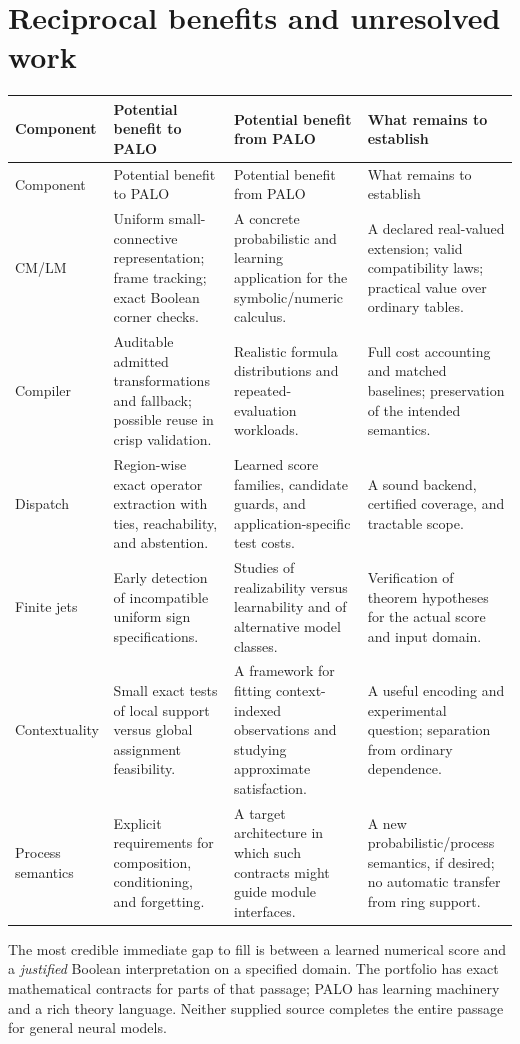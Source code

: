\documentclass[11pt,a4paper]{article}
\theoremstyle{remark}
\begin{document}
\section{Reciprocal benefits and unresolved work}
\small
\begin{longtable}{@{}P{23mm}P{41mm}P{41mm}P{30mm}@{}}
\toprule
Component & Potential benefit to PALO & Potential benefit from PALO & What remains to establish\\
\midrule
\endfirsthead
\toprule Component & Potential benefit to PALO & Potential benefit from PALO & What remains to establish\\\midrule
\endhead
CM/LM & Uniform small-connective representation; frame tracking; exact Boolean corner checks. & A concrete probabilistic and learning application for the symbolic/numeric calculus. & A declared real-valued extension; valid compatibility laws; practical value over ordinary tables.\\
Compiler & Auditable admitted transformations and fallback; possible reuse in crisp validation. & Realistic formula distributions and repeated-evaluation workloads. & Full cost accounting and matched baselines; preservation of the intended semantics.\\
Dispatch & Region-wise exact operator extraction with ties, reachability, and abstention. & Learned score families, candidate guards, and application-specific test costs. & A sound backend, certified coverage, and tractable scope.\\
Finite jets & Early detection of incompatible uniform sign specifications. & Studies of realizability versus learnability and of alternative model classes. & Verification of theorem hypotheses for the actual score and input domain.\\
Contextuality & Small exact tests of local support versus global assignment feasibility. & A framework for fitting context-indexed observations and studying approximate satisfaction. & A useful encoding and experimental question; separation from ordinary dependence.\\
Process semantics & Explicit requirements for composition, conditioning, and forgetting. & A target architecture in which such contracts might guide module interfaces. & A new probabilistic/process semantics, if desired; no automatic transfer from ring support.\\
\bottomrule
\end{longtable}
\normalsize

The most credible immediate gap to fill is between a learned numerical score and a \emph{justified} Boolean interpretation on a specified domain. The portfolio has exact mathematical contracts for parts of that passage; PALO has learning machinery and a rich theory language. Neither supplied source completes the entire passage for general neural models.
\end{document}
